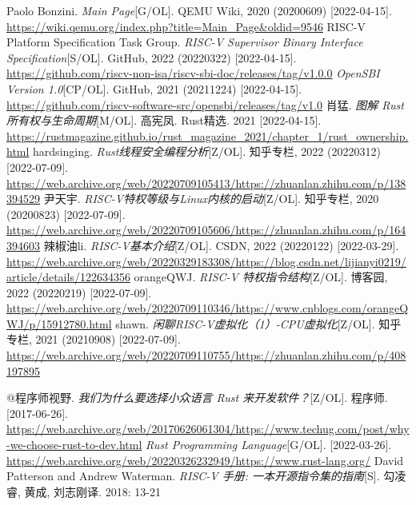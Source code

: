 \documentclass{../runikraft-report}
\begin{document}
\begin{thebibliography}{99}
  Paolo Bonzini. \textit{Main Page}[G/OL]. QEMU Wiki, 2020 (20200609) [2022-04-15]. \url{https://wiki.qemu.org/index.php?title=Main_Page&oldid=9546}
 RISC-V Platform Specification Task Group. \textit{RISC-V Supervisor Binary Interface Specification}[S/OL]. GitHub, 2022 (20220322) [2022-04-15]. \url{https://github.com/riscv-non-isa/riscv-sbi-doc/releases/tag/v1.0.0}
 \textit{OpenSBI Version 1.0}[CP/OL]. GitHub, 2021 (20211224) [2022-04-15]. \url{https://github.com/riscv-software-src/opensbi/releases/tag/v1.0}
 肖猛. \textit{图解 Rust 所有权与生命周期}[M/OL]. 高宪凤. Rust精选. 2021 [2022-04-15]. \url{https://rustmagazine.github.io/rust_magazine_2021/chapter_1/rust_ownership.html}
 hardsinging. \textit{Rust线程安全编程分析}[Z/OL]. 知乎专栏, 2022 (20220312) [2022-07-09]. \url{https://web.archive.org/web/20220709105413/https://zhuanlan.zhihu.com/p/138394529}
 尹天宇. \textit{RISC-V特权等级与Linux内核的启动}[Z/OL]. 知乎专栏, 2020 (20200823) [2022-07-09]. \url{https://web.archive.org/web/20220709105606/https://zhuanlan.zhihu.com/p/164394603}
 辣椒油li. \textit{RISC-V基本介绍}[Z/OL]. CSDN, 2022 (20220122) [2022-03-29]. \url{https://web.archive.org/web/20220329183308/https://blog.csdn.net/lijianyi0219/article/details/122634356}
 orangeQWJ. \textit{RISC-V 特权指令结构}[Z/OL]. 博客园, 2022 (20220219) [2022-07-09].  \url{https://web.archive.org/web/20220709110346/https://www.cnblogs.com/orangeQWJ/p/15912780.html}
 shawn. \textit{闲聊RISC-V虚拟化（1）-CPU虚拟化}[Z/OL]. 知乎专栏, 2021 (20210908) [2022-07-09]. \url{https://web.archive.org/web/20220709110755/https://zhuanlan.zhihu.com/p/408197895}

 @程序师视野. \textit{我们为什么要选择小众语言 Rust 来开发软件？}[Z/OL]. 程序师. [2017-06-26]. \url{https://web.archive.org/web/20170626061304/https://www.techug.com/post/why-we-choose-rust-to-dev.html}
 \textit{Rust Programming Language}[G/OL]. [2022-03-26]. \url{https://web.archive.org/web/20220326232949/https://www.rust-lang.org/}
 David Patterson and Andrew Waterman. \textit{RISC-V 手册: 一本开源指令集的指南}[S]. 勾凌睿, 黄成, 刘志刚译. 2018: 13-21


\end{thebibliography}
\end{document}
